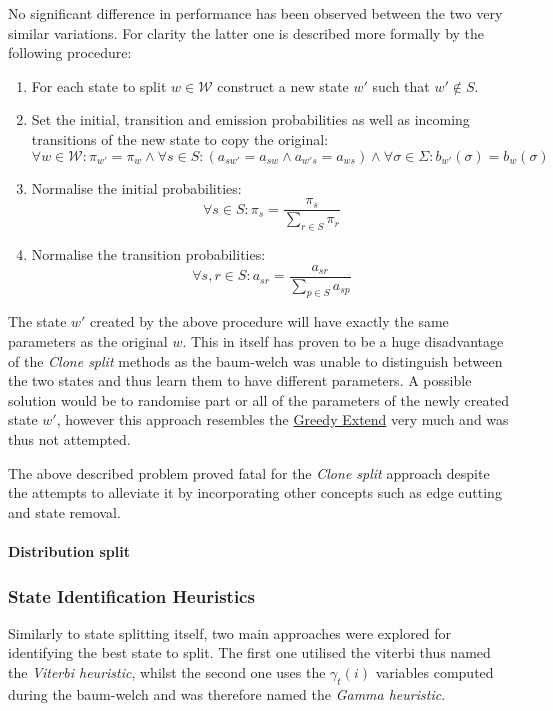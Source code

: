 No significant difference in performance has been observed between the two very similar variations. For clarity the latter one is described more formally by the following procedure:
\begin{enumerate}
	\item For each state to split $w \in\mathcal{W}$ construct a new state $w'$ such that $w'\notin S$.
	\item Set the initial, transition and emission probabilities as well as incoming transitions of the new state to copy the original:
	$$\forall w\in\mathcal{W}: \pi_{w'} = \pi_w \wedge \forall s\in S: (a_{sw'} = a_{sw} \wedge a_{w's} = a_{ws}) \wedge \forall \sigma\in\Sigma: b_{w'}(\sigma)=b_w(\sigma)$$
	\item Normalise the initial probabilities:
	$$\forall s\in S: \pi_s = \frac{\pi_s}{\sum_{r\in S}\pi_r}$$
	\item Normalise the transition probabilities:
	$$\forall s,r\in S: a_{sr} = \frac{a_{sr}}{\sum_{p\in S}a_{sp}}$$
\end{enumerate}

The state $w'$ created by the above procedure will have exactly the same parameters as the original $w$. This in itself has proven to be a huge disadvantage of the \emph{Clone split} methods as the \gls{baum-welch} was unable to distinguish between the two states and thus learn them to have different parameters. A possible solution would be to randomise part or all of the parameters of the newly created state $w'$, however this approach resembles the \hyperref[sec:greedy_extend]{Greedy Extend} very much and was thus not attempted.

The above described problem proved fatal for the \emph{Clone split} approach despite the attempts to alleviate it by incorporating other concepts such as edge cutting and state removal.

\paragraph{Distribution split}

\subsubsection{State Identification Heuristics}
Similarly to state splitting itself, two main approaches were explored for identifying the best state to split. The first one utilised the \gls{viterbi} thus named the \emph{Viterbi heuristic}, whilst the second one uses the $\gamma_t(i)$ variables computed during the \gls{baum-welch} and was therefore named the \emph{Gamma heuristic}.

